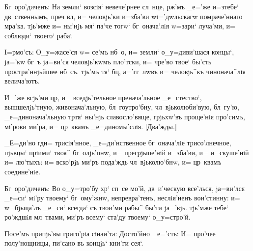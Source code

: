 Бг~оро'диченъ: На земли` возсiя` невече'рнее сл~нце, 
рж'мъ _е='же и=з\ъ тебе` дв~ственнымъ, преч 
вл, и= человjь'ки и=зба'ви w\т i='дwльскагw 
помраче'ннаго мра'ка. тjь'мже и= ны'нjь мя` па'че тогw` 
бг~онача'лiя w=зари` луча'ми, и= соблюди` твоего` раба`.


I=рмо'съ: О_у=жасе'ся w= се'мъ нб~о, и= земли` 
о_у=диви'шася концы`, jа='кw бг~ъ jа=ви'ся человjь'кwмъ 
пло'тски, и= чре'во твое` бы'сть простра'ннjьйшее нб~съ. 
тjь'мъ тя` бц, а='гг~лwвъ и= человjь^къ чинонача^лiя 
велича'ютъ.

И='же всjь'ми цр, и= вседjь'тельное 
пренача'льное _е=стество`, вышшелjь'тную, живонача'льную, 
бл~гоутро'бну, чл~вjьколюби'вую, бл~гу'ю, 
_е=динонача'льную тр тя` ны'нjь славосло'вяще, 
грjьхw'въ проще'нiя про'симъ, мi'рови ми'ра, и= цр~квамъ 
_е=диномы'слiя. [Два'жды.]

_Е=ди'но гд и= трисiя'нное, _е=ди'нственное 
бг~онача'лiе трисо'лнечное, пjьвцы` прiими` твоя^ 
бг~олjь'пнw, и= прегрjьше'нiй и=зба'ви, и= и=скуше'нiй и= 
лю'тыхъ: и= вско'рjь ми'ръ пода'ждь чл~вjьколю'бнw, и= 
цр~квамъ соедине'нiе.

Бг~оро'диченъ: Во о_у=тро'бу хр` сп~се мо'й, 
дв~и'ческую все'лься, jа=ви'лся _е=си` мi'ру твоему` 
бг~ому'жнw, непревра'тенъ, неслiя'ненъ вои'стинну: и= 
w=бjьща'лъ _е=си` всегда` съ твои'ми рабы^ бы'ти jа='вjь. 
тjь'мже тебе` ро'ждшiя мл~твами, ми'ръ всему` ста'ду 
твоему` о_у=стро'й.

Посе'мъ припjь'вы григо'рiа сiнаи'та: Досто'йно 
_е='сть: И= про'чее полу'нощницы, пи'сано въ концjь` 
кни'ги сея`.
